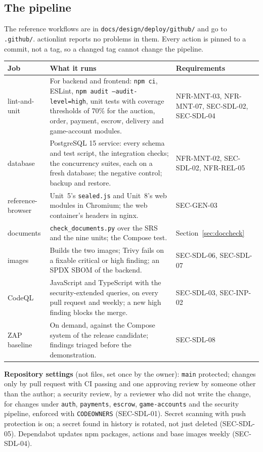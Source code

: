 \documentclass[11pt,a4paper]{article}
\newenvironment{dtable}[1]{\small\begin{longtable}{#1}}{\end{longtable}}
\begin{document}
\subsection{The pipeline}
The reference workflows are in \texttt{docs/design/deploy/github/} and go to \texttt{.github/}. actionlint reports no problems in them. Every action is pinned to a commit, not a tag, so a changed tag cannot change the pipeline.
\begin{dtable}{@{}>{\raggedright\arraybackslash}p{3.0cm}>{\raggedright\arraybackslash}p{8.6cm}>{\raggedright\arraybackslash}p{3.6cm}@{}}
\toprule
\textbf{Job} & \textbf{What it runs} & \textbf{Requirements} \\ \midrule \endhead
lint-and-unit & For backend and frontend: \texttt{npm ci}, ESLint, \texttt{npm audit --audit-level=high}, unit tests with coverage thresholds of 70\% for the auction, order, payment, escrow, delivery and game-account modules. & NFR-MNT-03, NFR-MNT-07, SEC-SDL-02, SEC-SDL-04 \\
database & PostgreSQL 15 service: every schema and test script, the integration checks; the concurrency suites, each on a fresh database; the negative control; backup and restore. & NFR-MNT-02, SEC-SDL-02, NFR-REL-05 \\
reference-browser & Unit~5's \texttt{sealed.js} and Unit~8's web modules in Chromium; the web container's headers in nginx. & SEC-GEN-03 \\
documents & \texttt{check\_\allowbreak documents.\allowbreak py} over the SRS and the nine units; the Compose test. & Section~\ref{sec:doccheck} \\
images & Builds the two images; Trivy fails on a fixable critical or high finding; an SPDX SBOM of the backend. & SEC-SDL-06, SEC-SDL-07 \\
CodeQL & JavaScript and TypeScript with the security-extended queries, on every pull request and weekly; a new high finding blocks the merge. & SEC-SDL-03, SEC-INP-02 \\
ZAP baseline & On demand, against the Compose system of the release candidate; findings triaged before the demonstration. & SEC-SDL-08 \\
\bottomrule
\end{dtable}
\textbf{Repository settings} (not files, set once by the owner): \texttt{main} protected; changes only by pull request with CI passing and one approving review by someone other than the author; a security review, by a reviewer who did not write the change, for changes under \texttt{auth}, \texttt{payments}, \texttt{escrow}, \texttt{game-accounts} and the security pipeline, enforced with \texttt{CODEOWNERS} (SEC-SDL-01). Secret scanning with push protection is on; a secret found in history is rotated, not just deleted (SEC-SDL-05). Dependabot updates npm packages, actions and base images weekly (SEC-SDL-04).
\end{document}
